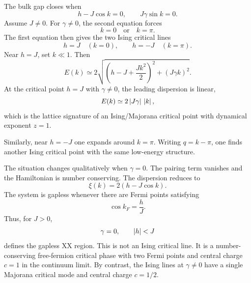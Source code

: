 The bulk gap closes when
\begin{equation}
\label{eq:xy-mother-gap-closing-condition}
    h-J\cos k=0,
    \qquad
    J\gamma\sin k=0.
\end{equation}
Assume $J\neq0$.  For $\gamma\neq0$, the second equation forces
\begin{equation}
    k=0
    \quad\text{or}\quad
    k=\pi.
\end{equation}
The first equation then gives the two Ising critical lines
\begin{equation}
\label{eq:xy-mother-ising-critical-lines}
    h=J
    \quad(k=0),
    \qquad
    h=-J
    \quad(k=\pi).
\end{equation}
Near $h=J$, set $k\ll1$.  Then
\begin{equation}
\label{eq:xy-mother-near-h-plus-J}
    E(k)
    \simeq
    2\sqrt{
        \left(h-J+\frac{Jk^2}{2}\right)^2
        +(J\gamma k)^2
    }.
\end{equation}
At the critical point $h=J$ with $\gamma\neq0$, the leading dispersion is
linear,
\begin{equation}
\label{eq:xy-mother-ising-linear-dispersion}
    E(k)\simeq 2\left|J\gamma\right|\,\left|k\right|,
\end{equation}
which is the lattice signature of an Ising/Majorana critical point with dynamical
exponent $z=1$.

Similarly, near $h=-J$ one expands around $k=\pi$.  Writing $q=k-\pi$, one finds
another Ising critical point with the same low-energy structure.

The situation changes qualitatively when $\gamma=0$.  The pairing term vanishes
and the Hamiltonian is number conserving.  The dispersion reduces to
\begin{equation}
\label{eq:xy-mother-xx-dispersion}
    \xi(k)=2(h-J\cos k).
\end{equation}
The system is gapless whenever there are Fermi points satisfying
\begin{equation}
\label{eq:xy-mother-fermi-points}
    \cos k_F=\frac{h}{J}.
\end{equation}
Thus, for $J>0$,
\begin{equation}
\label{eq:xy-mother-xx-critical-region}
    \gamma=0,
    \qquad
    \left|h\right|<J
\end{equation}
defines the gapless XX region.  This is not an Ising critical line.  It is a
number-conserving free-fermion critical phase with two Fermi points and central
charge $c=1$ in the continuum limit.  By contrast, the Ising lines at
$\gamma\neq0$ have a single Majorana critical mode and central charge $c=1/2$.

